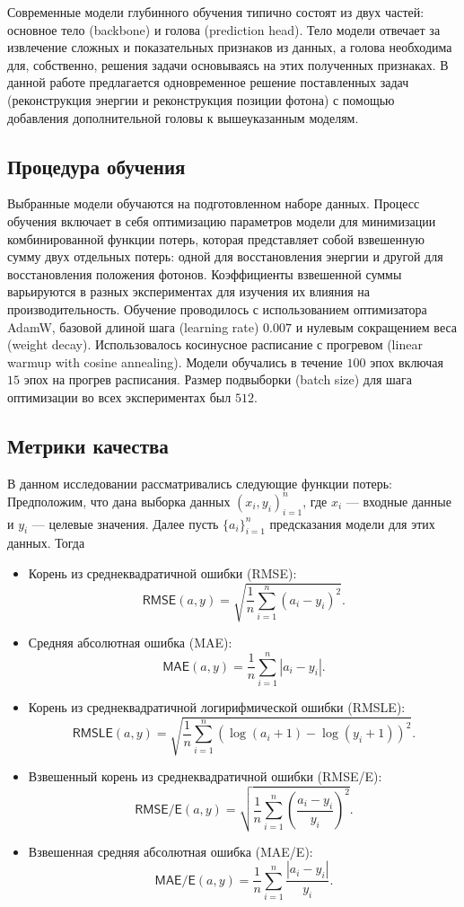 \documentclass[a4paper,12pt]{extarticle}
\begin{document}
Современные модели глубинного обучения типично состоят из двух частей: основное тело (backbone) и голова (prediction head). Тело модели отвечает за извлечение сложных и показательных признаков из данных, а голова необходима для, собственно, решения задачи основываясь на этих полученных признаках. В данной работе предлагается одновременное решение поставленных задач (реконструкция энергии и реконструкция позиции фотона) с помощью добавления дополнительной головы к вышеуказанным моделям.

\subsection{Процедура обучения}

Выбранные модели обучаются на подготовленном наборе данных. Процесс обучения включает в себя оптимизацию параметров модели для минимизации комбинированной функции потерь, которая представляет собой взвешенную сумму двух отдельных потерь: одной для восстановления энергии и другой для восстановления положения фотонов. Коэффициенты взвешенной суммы варьируются в разных экспериментах для изучения их влияния на производительность. Обучение проводилось с использованием оптимизатора AdamW, базовой длиной шага (learning rate) $0.007$ и нулевым сокращением веса (weight decay). Использовалось косинусное расписание с прогревом (linear warmup with cosine annealing). Модели обучались в течение $100$ эпох включая $15$ эпох на прогрев расписания. Размер подвыборки (batch size) для шага оптимизации во всех экспериментах был $512$.

\subsection{Метрики качества}
\label{subsection:metrics}

В данном исследовании рассматривались следующие функции потерь: Предположим, что дана выборка данных $(x_i, y_i)_{i = 1}^{n}$, где $x_i$ --- входные данные и $y_i$ --- целевые значения. Далее пусть $\{ a_i \}_{i = 1}^{n}$ предсказания модели для этих данных. Тогда

\begin{itemize}
    \item Корень из среднеквадратичной ошибки (\textsf{RMSE}): \[ \textsf{RMSE}(a, y) = \sqrt{\frac{1}{n} \sum_{i = 1}^{n} (a_i - y_i)^2} . \]
    \item Средняя абсолютная ошибка (\textsf{MAE}): \[ \textsf{MAE}(a, y) = \frac{1}{n} \sum_{i = 1}^{n} |a_i - y_i| . \]
    \item Корень из среднеквадратичной логирифмической ошибки (\textsf{RMSLE}): \[ \textsf{RMSLE}(a, y) = \sqrt{\frac{1}{n} \sum_{i = 1}^{n} (\log(a_i + 1) - \log(y_i + 1))^2} . \]
    \item Взвешенный корень из среднеквадратичной ошибки (\textsf{RMSE/E}): \[ \textsf{RMSE/E}(a, y) = \sqrt{\frac{1}{n} \sum_{i = 1}^{n} \left( \frac{a_i - y_i}{y_i} \right)^2} . \]
    \item Взвешенная средняя абсолютная ошибка (\textsf{MAE/E}): \[ \textsf{MAE/E}(a, y) = \frac{1}{n} \sum_{i = 1}^{n} \frac{|a_i - y_i|}{y_i} . \]
\end{itemize}
\end{document}
